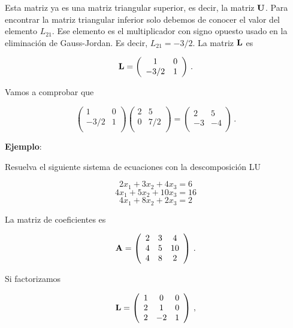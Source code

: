 \documentclass[
]{agujournal2019}
\begin{document}
Esta matriz ya es una matriz triangular superior, es decir, la matriz
\({\textbf U}\). Para encontrar la matriz triangular inferior solo
debemos de conocer el valor del elemento \(L_{21}\). Ese elemento es el
multiplicador con signo opuesto usado en la eliminación de Gauss-Jordan.
Es decir, \(L_{21}=-3/2\). La matriz \({\textbf L}\) es

\[{\textbf L}=\left(\begin{array}{ccccc}
  1 & 0\\
 -3/2 & 1\\
        \end{array}\right)\,.\]

Vamos a comprobar que

\[\left(\begin{array}{ccccc}
  1 & 0\\
 -3/2 & 1\\
        \end{array}\right)
    \left(\begin{array}{ccccc}
  2 & 5\\
 0 & 7/2\\
        \end{array}\right)
    =
    \left(\begin{array}{ccccc}
  2 & 5\\
 -3 & -4\\
        \end{array}\right)\,.\]

\vspace{0.5cm}

\textbf{Ejemplo}:

Resuelva el siguiente sistema de ecuaciones con la descomposición LU

\[2x_1+3x_2+4x_3=6\] \[4x_1+5x_2+10x_3=16\] \[4x_1+8x_2+2x_3=2\]

La matriz de coeficientes es

\[{\textbf A}=\left(\begin{array}{ccccc}
  2 & 3 & 4\\
  4 & 5 & 10\\
  4 & 8 & 2 \\
        \end{array}\right)\,.
\]

Si factorizamos

\[{\textbf L}=\left(\begin{array}{ccccc}
  1 & 0 & 0\\
  2 & 1 & 0\\
  2 & -2 & 1 \\
        \end{array}\right)\,,
\]
\end{document}
